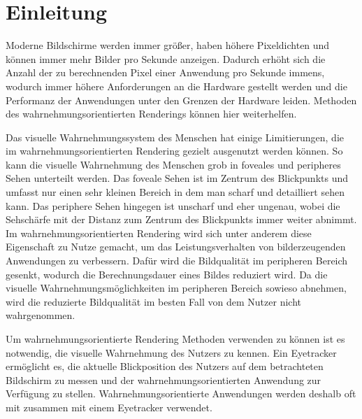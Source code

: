 \chapter{Einleitung}\label{chap::intro}
Moderne Bildschirme werden immer größer, haben höhere Pixeldichten und können immer mehr Bilder pro Sekunde anzeigen.
Dadurch erhöht sich die Anzahl der zu berechnenden Pixel einer Anwendung pro Sekunde immens, wodurch immer höhere Anforderungen an die Hardware gestellt werden und die Performanz der Anwendungen unter den Grenzen der Hardware leiden. 
Methoden des wahrnehmungsorientierten Renderings können hier weiterhelfen. 

Das visuelle Wahrnehmungssystem des Menschen hat einige Limitierungen, die im wahrnehmungsorientierten Rendering gezielt ausgenutzt werden können.
So kann die visuelle Wahrnehmung des Menschen grob in foveales und peripheres Sehen unterteilt werden.
Das foveale Sehen ist im Zentrum des Blickpunkts und umfasst nur einen sehr kleinen Bereich in dem man scharf und detailliert sehen kann.
Das periphere Sehen hingegen ist unscharf und eher ungenau, wobei die Sehschärfe mit der Distanz zum Zentrum des Blickpunkts immer weiter abnimmt.
Im wahrnehmungsorientierten Rendering wird sich unter anderem diese Eigenschaft zu Nutze gemacht, um das Leistungsverhalten von bilderzeugenden Anwendungen zu verbessern.
Dafür wird die Bildqualität im peripheren Bereich gesenkt, wodurch die Berechnungsdauer eines Bildes reduziert wird.
Da die visuelle Wahrnehmungsmöglichkeiten im peripheren Bereich sowieso abnehmen, wird die reduzierte Bildqualität im besten Fall von dem Nutzer nicht wahrgenommen.

Um wahrnehmungsorientierte Rendering Methoden verwenden zu können ist es notwendig, die visuelle Wahrnehmung des Nutzers zu kennen.
Ein Eyetracker ermöglicht es, die aktuelle Blickposition des Nutzers auf dem betrachteten Bildschirm zu messen und der wahrnehmungsorientierten Anwendung zur Verfügung zu stellen.
Wahrnehmungsorientierte Anwendungen werden deshalb oft mit zusammen mit einem Eyetracker verwendet.

